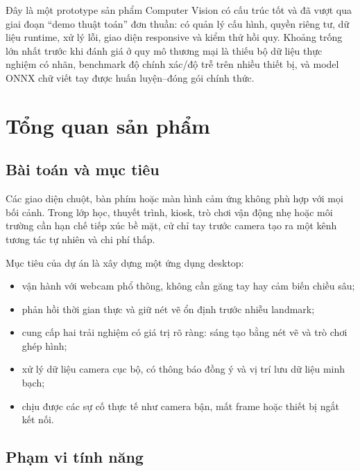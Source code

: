 \documentclass[12pt,a4paper,oneside]{report}
\begin{document}
\begin{redbox}
Đây là một prototype sản phẩm Computer Vision có cấu trúc tốt và đã vượt qua giai đoạn ``demo thuật toán'' đơn thuần: có quản lý cấu hình, quyền riêng tư, dữ liệu runtime, xử lý lỗi, giao diện responsive và kiểm thử hồi quy. Khoảng trống lớn nhất trước khi đánh giá ở quy mô thương mại là thiếu bộ dữ liệu thực nghiệm có nhãn, benchmark độ chính xác/độ trễ trên nhiều thiết bị, và model ONNX chữ viết tay được huấn luyện--đóng gói chính thức.
\end{redbox}

\clearpage
{}

\chapter{Tổng quan sản phẩm}

\section{Bài toán và mục tiêu}

Các giao diện chuột, bàn phím hoặc màn hình cảm ứng không phù hợp với mọi bối cảnh. Trong lớp học, thuyết trình, kiosk, trò chơi vận động nhẹ hoặc môi trường cần hạn chế tiếp xúc bề mặt, cử chỉ tay trước camera tạo ra một kênh tương tác tự nhiên và chi phí thấp.

Mục tiêu của dự án là xây dựng một ứng dụng desktop:

\begin{itemize}
  \item vận hành với webcam phổ thông, không cần găng tay hay cảm biến chiều sâu;
  \item phản hồi thời gian thực và giữ nét vẽ ổn định trước nhiễu landmark;
  \item cung cấp hai trải nghiệm có giá trị rõ ràng: sáng tạo bằng nét vẽ và trò chơi ghép hình;
  \item xử lý dữ liệu camera cục bộ, có thông báo đồng ý và vị trí lưu dữ liệu minh bạch;
  \item chịu được các sự cố thực tế như camera bận, mất frame hoặc thiết bị ngắt kết nối.
\end{itemize}

\section{Phạm vi tính năng}
\end{document}

